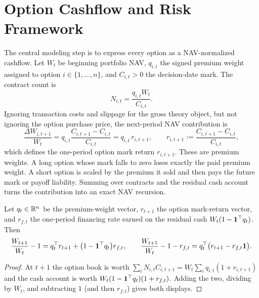 \section{Option Cashflow and Risk Framework}\label{sec:cashflow}

The central modeling step is to express every option as a NAV-normalized cashflow. Let
\(W_t\) be beginning portfolio NAV, \(q_{i,t}\) the signed premium weight assigned to option
\(i\in\{1,\dots,n\}\), and \(C_{i,t}>0\) the decision-date mark. The contract count is
\[
  N_{i,t}=\frac{q_{i,t}W_t}{C_{i,t}}.
\]
Ignoring transaction costs and slippage for the gross theory object, but not ignoring the
option purchase price, the next-period NAV contribution is
\[
  \frac{\Delta W_{i,t+1}}{W_t}
  =q_{i,t}\frac{C_{i,t+1}-C_{i,t}}{C_{i,t}}
  =q_{i,t}\,r_{i,t+1},
  \qquad
  r_{i,t+1}:=\frac{C_{i,t+1}-C_{i,t}}{C_{i,t}},
\]
which defines the one-period option mark return \(r_{i,t+1}\). These are premium weights. A
long option whose mark falls to zero loses exactly the paid premium weight. A short option
is scaled by the premium it sold and then pays the future mark or payoff liability. Summing
over contracts and the residual cash account turns the contribution into an exact NAV
recursion.

\begin{proposition}\label{prop:nav}
Let \(q_t\in\mathbb{R}^n\) be the premium-weight vector, \(r_{t+1}\) the option mark-return vector,
and \(r_{f,t}\) the one-period financing rate earned on the residual cash
\(W_t(1-\mathbf{1}^\top q_t)\). Then
\[
  \frac{W_{t+1}}{W_t}-1
  =q_t^\top r_{t+1}+\bigl(1-\mathbf{1}^\top q_t\bigr)r_{f,t},
  \qquad
  \frac{W_{t+1}}{W_t}-1-r_{f,t}
  =q_t^\top\bigl(r_{t+1}-r_{f,t}\mathbf{1}\bigr).
\]
\end{proposition}

\begin{proof}
At \(t+1\) the option book is worth
\(\sum_i N_{i,t}C_{i,t+1}=W_t\sum_i q_{i,t}(1+r_{i,t+1})\) and the cash account is worth
\(W_t(1-\mathbf{1}^\top q_t)(1+r_{f,t})\). Adding the two, dividing by \(W_t\), and subtracting
\(1\) (and then \(r_{f,t}\)) gives both displays.
\end{proof}

